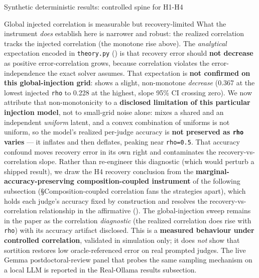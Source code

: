 \documentclass[
  ignorenonframetext,
]{beamer}
\begin{document}
\begin{frame}{Synthetic deterministic results:
controlled spine for H1-H4}
\begin{block}{Global injected correlation is measurable but
recovery-limited}
What the instrument \emph{does} establish here is narrower and robust:
the realized correlation tracks the injected correlation (the monotone
rise above). The \emph{analytical} expectation encoded in
\texttt{theory.py} () is that
recovery error should \textbf{not decrease} as positive
error-correlation grows, because correlation violates the
error-independence the exact solver assumes. That expectation is
\textbf{not confirmed on this global-injection grid}:
 shows a slight, non-monotone
\emph{decrease} (0.367 at the lowest injected \texttt{rho} to 0.228 at
the highest, slope 95\% CI crossing zero). We now attribute that
non-monotonicity to a \textbf{disclosed limitation of this particular
injection model}, not to small-grid noise alone:
 mixes a shared and an
independent \emph{uniform} latent, and a convex combination of uniforms
is not uniform, so the model's realized per-judge accuracy is
\textbf{not preserved as \texttt{rho} varies} --- it inflates and then
deflates, peaking near \texttt{rho=0.5}. That accuracy confound moves
recovery error in its own right and contaminates the
recovery-vs-correlation slope. Rather than re-engineer this diagnostic
(which would perturb a shipped result), we draw the H4 recovery
conclusion from the \textbf{marginal-accuracy-preserving
composition-coupled instrument} of the following subsection
(§Composition-coupled correlation fans the strategies apart), which
holds each judge's accuracy fixed by construction and resolves the
recovery-vs-correlation relationship in the affirmative
(). The global-injection sweep remains in the paper
as the correlation \emph{diagnostic} (the realized correlation does rise
with \texttt{rho}) with its accuracy artifact disclosed. This is a
\textbf{measured behaviour under controlled correlation}, validated in
simulation only; it does \emph{not} show that sortition restores low
oracle-referenced error on real prompted judges. The live Gemma
postdoctoral-review panel that probes the same sampling mechanism on a
local LLM is reported in the Real-Ollama results subsection.
\end{block}


\end{frame}
\end{document}
